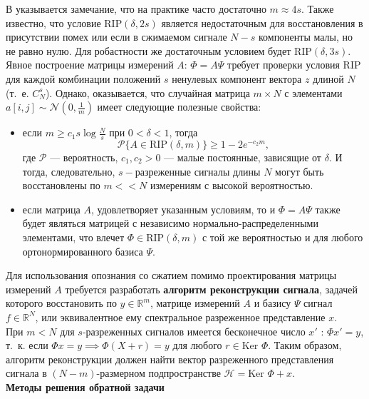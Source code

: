 \documentclass[14pt]{matmex-diploma}
\begin{document}
В \cite{cande2008introduction} указывается замечание, что на практике часто достаточно $m\approx 4s$. Также известно, что условие $\text{RIP}(\delta, 2s)$ является недостаточным для восстановления в присутствии помех или если в сжимаемом сигнале $N - s$ компоненты малы, но не равно нулю. Для робастности же достаточным условием будет $\text{RIP}(\delta, 3s)$. Явное построение матрицы измерений $A$: $\Phi = A\Psi$ требует проверки условия RIP для каждой комбинации положений $s$ ненулевых компонент вектора $z$ длиной $N$ (т.~е. $C_N^s$). Однако, оказывается, что случайная матрица $m \times N$ с элементами $a[i, j] \sim \mathcal{N}(0, \frac{1}{m})$ имеет следующие полезные свойства\cite{candes2006robust}:
\begin{itemize}
\item если $m \geq c_1 s \log{\frac{N}{s}}$ при $0 < \delta < 1$, тогда \\
$$\mathcal{P}\{A \in \text{RIP}(\delta, m)\} \geq 1 - 2e^{-c_2 m},$$
где $\mathcal{P}$ --- вероятность, $c_1,c_2 > 0$  --- малые постоянные, зависящие от $\delta$. И тогда, следовательно, $s-$разреженные сигналы длины $N$ могут быть восстановлены по $m << N$ измерениям с высокой вероятностью.
\item если матрица $A$, удовлетворяет указанным условиям, то и $\Phi = A\Psi$ также будет являться матрицей с независимо нор\-маль\-но-рас\-пре\-де\-лен\-ными элементами, что влечет $\Phi \in \text{RIP}(\delta ,m)$ с той же вероятностью и для любого ортонормированного базиса $\Psi$.
\end{itemize}

Для использования опознания со сжатием помимо проектирования матрицы измерений $A$ требуется разработать \textbf{алгоритм реконструкции сигнала}, задачей которого восстановить по $y \in \mathbb{R}^m$, матрице измерений $A$ и базису $\Psi$ сигнал $f \in \mathbb{R}^N$, или эквивалентное ему спектральное разреженное представление $x$.\\

При $m < N$ для $s$-разреженных сигналов имеется бесконечное число $x'$ : $\Phi x' = y$, т.~к. если $\Phi x = y \implies \Phi(X+r) = y$ для любого $r \in \text{Ker }\Phi$. Таким образом, алгоритм реконструкции должен найти вектор разреженного представления сигнала в $(N - m)$-размерном подпространстве $\mathcal{H}=\text{Ker }\Phi + x$.\\

\textbf{Методы решения обратной задачи}\\
\end{document}
